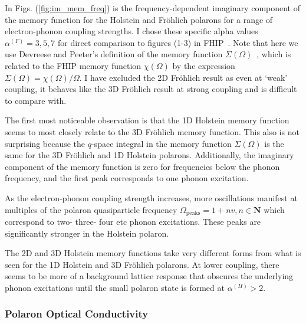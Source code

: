 In Figs. (\ref{fig:im_mem_freq}) is the frequency-dependent imaginary component of the memory function for the Holstein and Fr\"ohlich polarons for a range of electron-phonon coupling strengths. I chose these specific alpha values $\alpha^{(F)} = 3, 5, 7$ for direct comparison to figures (1-3) in FHIP~\cite{feynman_mobility_1962}. Note that here we use Devreese and Peeter's definition of the memory function $\Sigma(\Omega)$~\cite{peeters_theory_1984}, which is related to the FHIP memory function $\chi(\Omega)$ by the expression $\Sigma(\Omega) = \chi(\Omega) / \Omega$. I have excluded the 2D Fr\"ohlich result as even at `weak' coupling, it behaves like the 3D Fr\"ohlich result at strong coupling and is difficult to compare with.

The first most noticeable observation is that the 1D Holstein memory function seems to most closely relate to the 3D Fr\"ohlich memory function. This also is not surprising because the $q$-space integral in the memory function $\Sigma(\Omega)$ is the same for the 3D Fr\"ohlich and 1D Holstein polarons. Additionally, the imaginary component of the memory function is zero for frequencies below the phonon frequency, and the first peak corresponds to one phonon excitation.

As the electron-phonon coupling strength increases, more oscillations manifest at multiples of the polaron quasiparticle frequency $\Omega_{\text{peaks}} = 1 + n v, n \in \mathbf{N}$ which correspond to two- three- four etc phonon excitations. These peaks are significantly stronger in the Holstein polaron. 

The 2D and 3D Holstein memory functions take very different forms from what is seen for the 1D Holstein and 3D Fr\"ohlich polarons. At lower coupling, there seems to be more of a background lattice response that obscures the underlying phonon excitations until the small polaron state is formed at $\alpha^{(H)} > 2$.

\subsubsection{Polaron Optical Conductivity}

